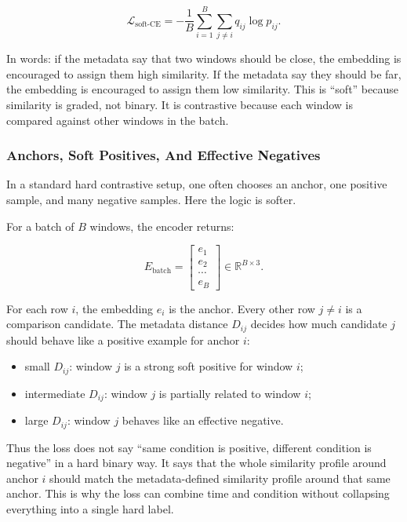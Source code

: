 \documentclass[11pt]{article}
\begin{document}
\begin{equation}
\mathcal{L}_{\text{soft-CE}}
=
-
\frac{1}{B}
\sum_{i=1}^{B}
\sum_{j\ne i}
q_{ij}\log p_{ij}.
\end{equation}

In words: if the metadata say that two windows should be close, the embedding
is encouraged to assign them high similarity. If the metadata say they should
be far, the embedding is encouraged to assign them low similarity. This is
``soft'' because similarity is graded, not binary. It is contrastive because
each window is compared against other windows in the batch.

\subsubsection{Anchors, Soft Positives, And Effective Negatives}

In a standard hard contrastive setup, one often chooses an anchor, one positive
sample, and many negative samples. Here the logic is softer.

For a batch of $B$ windows, the encoder returns:

\begin{equation}
E_{\text{batch}}
=
\begin{bmatrix}
e_1 \\
e_2 \\
\cdots \\
e_B
\end{bmatrix}
\in
\mathbb{R}^{B \times 3}.
\end{equation}

For each row $i$, the embedding $e_i$ is the anchor. Every other row $j \ne i$
is a comparison candidate. The metadata distance $D_{ij}$ decides how much
candidate $j$ should behave like a positive example for anchor $i$:

\begin{itemize}
    \item small $D_{ij}$: window $j$ is a strong soft positive for window $i$;
    \item intermediate $D_{ij}$: window $j$ is partially related to window $i$;
    \item large $D_{ij}$: window $j$ behaves like an effective negative.
\end{itemize}

Thus the loss does not say ``same condition is positive, different condition
is negative'' in a hard binary way. It says that the whole similarity profile
around anchor $i$ should match the metadata-defined similarity profile around
that same anchor. This is why the loss can combine time and condition without
collapsing everything into a single hard label.
\end{document}
